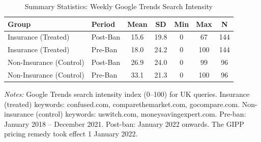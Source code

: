 \begin{table}[htbp]
\centering
\caption{Summary Statistics: Weekly Google Trends Search Intensity}
\label{tab:summary}
\begin{threeparttable}
\begin{tabular}{llccccc}
\toprule
Group & Period & Mean & SD & Min & Max & N \\
\midrule
Insurance (Treated) & Post-Ban & 15.6 & 19.8 & 0 & 67 & 144 \\
Insurance (Treated) & Pre-Ban & 18.0 & 24.2 & 0 & 100 & 144 \\
Non-Insurance (Control) & Post-Ban & 26.9 & 24.0 & 0 & 99 & 96 \\
Non-Insurance (Control) & Pre-Ban & 33.1 & 21.3 & 0 & 100 & 96 \\
\bottomrule
\end{tabular}
\begin{tablenotes}[flushleft]
\small
\item \textit{Notes:} Google Trends search intensity index (0--100) for UK queries. Insurance (treated) keywords: confused.com, comparethemarket.com, gocompare.com. Non-insurance (control) keywords: uswitch.com, moneysavingexpert.com. Pre-ban: January 2018 -- December 2021. Post-ban: January 2022 onwards. The GIPP pricing remedy took effect 1 January 2022.
\end{tablenotes}
\end{threeparttable}
\end{table}
